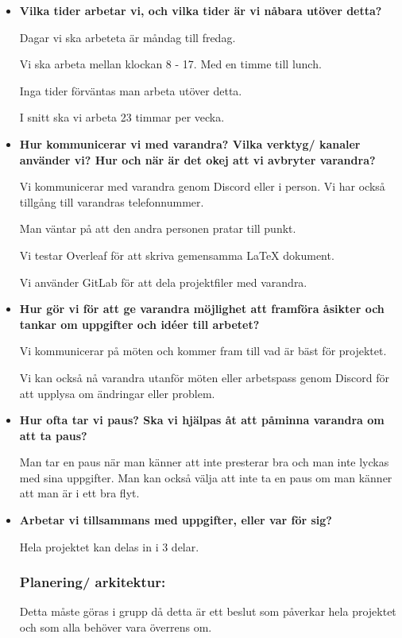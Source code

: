 \documentclass{liu_mall}
\begin{document}
\begin{itemize}
\item \textbf{Vilka tider arbetar vi, och vilka tider är vi nåbara utöver detta?}

  Dagar vi ska arbeteta är måndag till fredag.

  Vi ska arbeta mellan klockan 8 - 17. Med en timme till lunch.

  Inga tider förväntas man arbeta utöver detta.

  I snitt ska vi arbeta 23 timmar per vecka.

\item \textbf{Hur kommunicerar vi med varandra? Vilka verktyg/ kanaler använder vi? Hur och när är det okej att vi avbryter varandra?}

  Vi kommunicerar med varandra genom Discord eller i person. Vi har också tillgång till varandras telefonnummer.
  
  Man väntar på att den andra personen pratar till punkt.

  Vi testar Overleaf för att skriva gemensamma LaTeX dokument.

  Vi använder GitLab för att dela projektfiler med varandra.

\item \textbf{Hur gör vi för att ge varandra möjlighet att framföra åsikter och tankar om uppgifter och idéer till arbetet?}

  Vi kommunicerar på möten och kommer fram till vad är bäst för projektet.

  Vi kan också nå varandra utanför möten eller arbetspass genom Discord för att upplysa om ändringar eller problem.

\item \textbf{Hur ofta tar vi paus? Ska vi hjälpas åt att påminna varandra om att ta paus?}

  Man tar en paus när man känner att inte presterar bra och man inte lyckas med sina uppgifter. Man kan också välja att inte ta en paus om man känner att man är i ett bra flyt.

\item \textbf{Arbetar vi tillsammans med uppgifter, eller var för sig?}

  Hela projektet kan delas in i 3 delar.

  \subsubsection{Planering/ arkitektur:}
  Detta måste göras i grupp då detta är ett beslut som påverkar hela projektet och som alla behöver vara överrens om.
  

\end{itemize}
\end{document}
